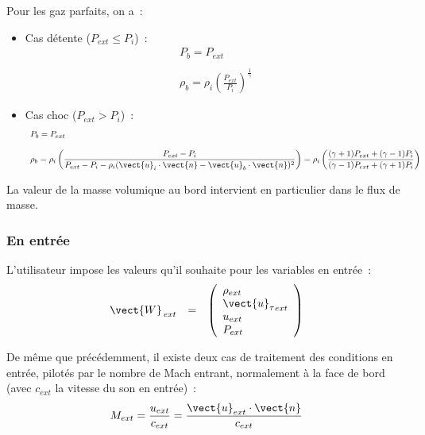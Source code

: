 \begin{enumerate}
\bigskip
Pour les gaz parfaits, on a~:
\begin{itemize}

\item Cas détente ($P_{ext} \leqslant P_i$)~:\\
$$
\begin{array}{l}
P_b=P_{ext}\\
\\
\rho_b=\rho_i \left(\displaystyle\frac{P_{ext}}{P_i}\right)^{\frac{1}{\gamma}}
\end{array}
$$

\item Cas choc ($P_{ext} > P_i$)~:\\
$$
\begin{array}{l}
P_b=P_{ext}\\
\\
\rho_b=\rho_i \left(\displaystyle\frac{P_{ext}-P_i}{P_{ext}-P_i-\rho_i
(\vect{u}_i \cdot \vect{n} - \vect{u}_b \cdot \vect{n})^2}\right)
= \rho_i \left(\displaystyle\frac{(\gamma+1)P_{ext}+(\gamma-1)P_i}
{(\gamma-1)P_{ext}+(\gamma+1)P_i}\right)\\
\end{array}
$$

\end{itemize}

\end{enumerate}

La valeur de la masse volumique au bord intervient en particulier
dans le flux de masse.


\subsubsection*{En entrée}

L'utilisateur impose les valeurs qu'il souhaite pour les variables
en entrée~:
$$
\begin{array}{lllll}
\vect{W}_{\,ext} &=&
\left(\begin{array}{l}
\rho_{ext}\\ {\vect{u}_\tau}_{ext}\\ u_{ext}\\ P_{ext}
\end{array}\right)
\end{array}
$$

De même que précédemment, il existe deux cas de traitement
des conditions en entrée,
pilotés par le nombre de Mach entrant, normalement à la face de bord
(avec $c_{ext}$ la vitesse du son en entrée)~:
$$M_{ext} = \displaystyle\frac{u_{ext}}{c_{ext}}
= \displaystyle\frac{\vect{u}_{ext} \cdot \vect{n}}{c_{ext}}$$

